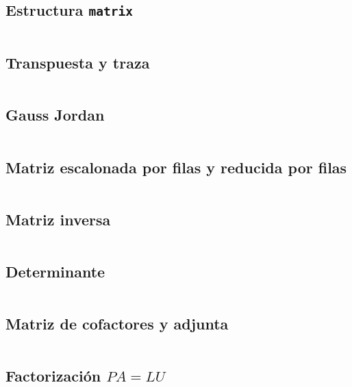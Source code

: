 \documentclass[11pt]{article}
\begin{document}
		\subsection{Estructura \texttt{matrix}}
		\inputminted[tabsize=2,breaklines,firstline=7,lastline=130,fontsize=\small]{c++}{matrix.cpp}
		
		\subsection{Transpuesta y traza}
		\inputminted[tabsize=2,breaklines,firstline=132,lastline=145,fontsize=\small]{c++}{matrix.cpp}
		
		\subsection{Gauss Jordan}
		\inputminted[tabsize=2,breaklines,firstline=147,lastline=190,fontsize=\small]{c++}{matrix.cpp}
		
		\subsection{Matriz escalonada por filas y reducida por filas}
		\inputminted[tabsize=2,breaklines,firstline=192,lastline=202,fontsize=\small]{c++}{matrix.cpp}
		
		\subsection{Matriz inversa}
		\inputminted[tabsize=2,breaklines,firstline=204,lastline=225,fontsize=\small]{c++}{matrix.cpp}
		
		\subsection{Determinante}
		\inputminted[tabsize=2,breaklines,firstline=227,lastline=240,fontsize=\small]{c++}{matrix.cpp}
		
		\subsection{Matriz de cofactores y adjunta}
		\inputminted[tabsize=2,breaklines,firstline=242,lastline=267,fontsize=\small]{c++}{matrix.cpp}
		
		\subsection{Factorización $PA=LU$}
		\inputminted[tabsize=2,breaklines,firstline=269,lastline=285,fontsize=\small]{c++}{matrix.cpp}
		
\end{document}
